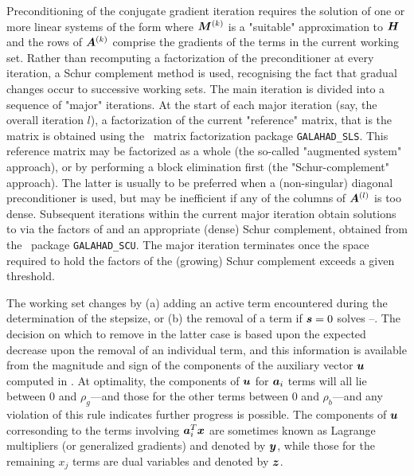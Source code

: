 \documentclass{galahad}
\begin{document}
Preconditioning of the conjugate gradient iteration
requires the solution of one or more linear systems of the form
where ${\bm{M}}^{(k)}$ is a "suitable" approximation to ${\bm{H}}$
and the rows of ${\bm{A}}^{(k)}$ comprise the gradients of the
terms in the current working set. Rather than recomputing a
factorization of the preconditioner at every iteration, a
Schur complement method is used, recognising the fact that
gradual changes occur to successive working sets. The main
iteration is divided into a sequence of "major" iterations.
At the start of each major iteration (say, the overall iteration $l$), 
a factorization of the
current "reference" matrix, that is the matrix
is obtained using the \galahad\ matrix factorization package 
{\tt GALAHAD\_SLS}.
This reference matrix may be factorized as a whole (the so-called 
"augmented system" approach), or by performing a block elimination first 
(the "Schur-complement" approach). The latter is usually to be preferred 
when a (non-singular) diagonal 
preconditioner is used, but may be inefficient if any of the columns
of ${\bm{A}}^{(l)}$ is too dense.
Subsequent iterations within the current major
iteration obtain solutions to  via the factors of 
and an appropriate (dense) Schur complement,
obtained from the \galahad\ package {\tt GALAHAD\_SCU}.
The major iteration terminates
once the space required to hold the factors of the (growing) Schur
complement exceeds a given threshold.

The working set changes by (a) adding an active term encountered during 
the determination of the stepsize, or (b) the removal of a term if ${\bm{s}} = 0$
solves --. The  decision on which to remove in the latter 
case is based upon the expected decrease upon the removal of an individual term,
and this information is available from the magnitude and sign of the components
of the auxiliary vector ${\bm{u}}$ computed in . At optimality, the
components of ${\bm{u}}$ for ${\bm{a}}_i$ terms will all lie between 
$0$ and $\rho_g$---and those for the other terms 
between $0$ and $\rho_b$---and any violation
of this rule indicates further progress is possible. The components
of ${\bm{u}}$ corresonding to the terms involving ${\bm{a}}_i^T {\bm{x}}$
are sometimes known as Lagrange multipliers (or generalized gradients) and
denoted by ${\bm{y}}$, while those for the remaining $x_j$ terms are dual variables
and denoted by ${\bm{z}}$.
\end{document}

